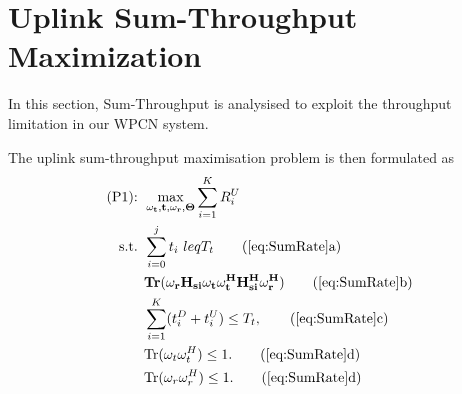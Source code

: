 \documentclass[12pt,draft,onecolumn,journal]{IEEEtran}
\begin{document}
\section{Uplink Sum-Throughput Maximization}

In this section, Sum-Throughput is analysised to exploit the throughput limitation in our WPCN system.

The uplink sum-throughput maximisation problem is then formulated as
\begin{align}
	\text{(P1): } & \max_{\mathbf{\omega_t}, \mathbf{t}, \mathbf{\omega_r}, \mathbf{\Theta}} \sum_{i=1}^K R_{i}^U  \label{eq:SumRate}\\
	\text{s.t. } & \sum_{i = 0}^j t_i \ leq T_t \tag{\ref{eq:SumRate}a} \label{eq:SumRate-a} \\
	& \mathbf{Tr(\omega_rH_{si}\omega_t\omega_t^HH_{si}^H\omega_r^H)} \tag{\ref{eq:SumRate}b} \label{eq:SumRate-b} \\
	& \sum_{i=1}^K(t_i^D + t_i^U) \leq T_t, \tag{\ref{eq:SumRate}c} \label{eq:SumRate-c} \\
	& \text{Tr}(\mathbf{\omega}_t\mathbf{\omega}_t^H) \leq 1. \tag{\ref{eq:SumRate}d} \label{eq:SumRate-d} \\
	& \text{Tr}(\mathbf{\omega}_r\mathbf{\omega}_r^H) \leq 1. \tag{\ref{eq:SumRate}d} \label{eq:SumRate-e}
\end{align}
\end{document}
